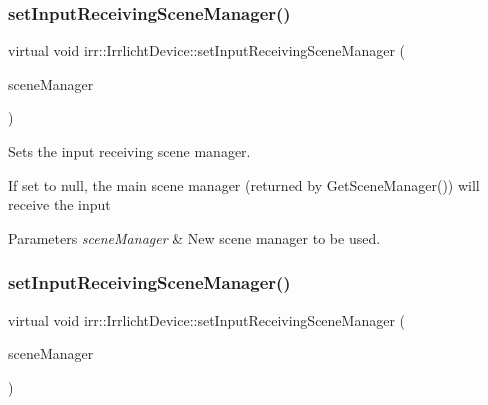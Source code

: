 \subsubsection{\texorpdfstring{set\+Input\+Receiving\+Scene\+Manager()}{setInputReceivingSceneManager()}\hspace{0.1cm}{\footnotesize\ttfamily [1/3]}}
{\footnotesize\ttfamily virtual void irr\+::\+Irrlicht\+Device\+::set\+Input\+Receiving\+Scene\+Manager (\begin{DoxyParamCaption}\item[{\hyperlink{classirr_1_1scene_1_1ISceneManager}{scene\+::\+I\+Scene\+Manager} $\ast$}]{scene\+Manager }\end{DoxyParamCaption})\hspace{0.3cm}{\ttfamily [pure virtual]}}



Sets the input receiving scene manager. 

If set to null, the main scene manager (returned by Get\+Scene\+Manager()) will receive the input 
\begin{DoxyParams}{Parameters}
{\em scene\+Manager} & New scene manager to be used. \\
\hline
\end{DoxyParams}
\mbox{\label{classirr_1_1IrrlichtDevice_a22ab84f23050dbef122f16a33aa9b91d}} 
\subsubsection{\texorpdfstring{set\+Input\+Receiving\+Scene\+Manager()}{setInputReceivingSceneManager()}\hspace{0.1cm}{\footnotesize\ttfamily [2/3]}}
{\footnotesize\ttfamily virtual void irr\+::\+Irrlicht\+Device\+::set\+Input\+Receiving\+Scene\+Manager (\begin{DoxyParamCaption}\item[{\hyperlink{classirr_1_1scene_1_1ISceneManager}{scene\+::\+I\+Scene\+Manager} $\ast$}]{scene\+Manager }\end{DoxyParamCaption})\hspace{0.3cm}{\ttfamily [pure virtual]}}




